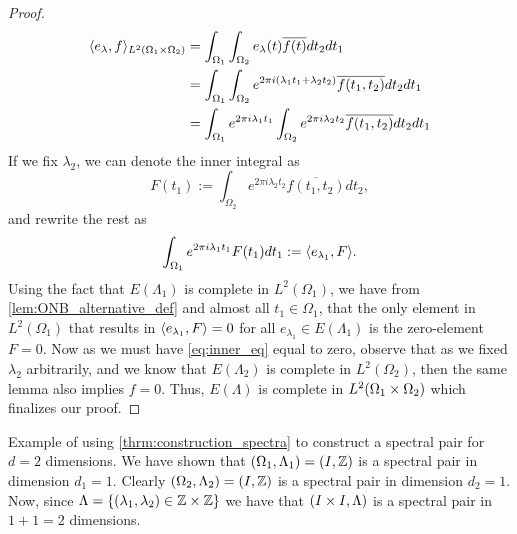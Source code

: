 \documentclass[../thesis.tex]{subfiles}
\begin{document}
\begin{proof}
    \begin{align*} %
        \braa{e_\lambda,f}_{L^2\brac{\Omega_1 \times \Omega_2}}
        &= \int_{\Omega_1} \int_{\Omega_2} e_\lambda(t) \overline{f(t)} dt_2dt_1 \\
        &= \int_{\Omega_1} \int_{\Omega_2} e^{2\pi i  (\lambda_1 t_1 + \lambda_2 t_2)} \overline{f(t_1,t_2)} dt_2 dt_1 \\
        &= \int_{\Omega_1} e^{2 \pi i \lambda_1 t_1} \int_{\Omega_2}e^{2 \pi i \lambda_2 t_2} \overline{f(t_1,t_2)} dt_2 dt_1 \\
    \end{align*}
    If we fix $\lambda_2$, we can denote the inner integral as 
    \begin{equation}\label{eq:inner_eq}
        F(t_1) := \int_{\Omega_2} e^{2 \pi i \lambda_2 t_2} \overline{f(t_1,t_2)} dt_2,
    \end{equation}
    and rewrite the rest as
    \begin{equation}\label{eq:outter_eq}
        \int_{\Omega_1} e^{2 \pi i \lambda_1 t_1} F(t_1) dt_1 := \langle e_{\lambda_1}, F\rangle.
    \end{equation}
    Using the fact that $E(\Lambda_1)$ is complete in $L^2(\Omega_1)$, we have from \cref{lem:ONB_alternative_def} and almost all $t_1 \in \Omega_1$, that the only element in $L^2(\Omega_1)$ that results in $\langle e_{\lambda_1}, F\rangle = 0$ for all $e_{\lambda_1} \in E(\Lambda_1)$ is the zero-element $F=0$. Now as we must have \cref{eq:inner_eq} equal to zero, observe that as we fixed $\lambda_2$ arbitrarily, and we know that $E(\Lambda_2)$ is complete in $L^2(\Omega_2)$, then the same lemma also implies $f=0$. Thus, $E(\Lambda)$ is complete in $L^2(\Omega_1 \times \Omega_2)$ which finalizes our proof.
\end{proof}


\begin{example}
    Example of using \cref{thrm:construction_spectra} to construct a spectral pair for $d=2$ dimensions. 
    We have shown that $(\Omega_1,\Lambda_1) = (I, \mathbb{Z})$ is a spectral pair in dimension $d_1=1$. Clearly $(\Omega_2,\Lambda_2) = (I, \mathbb{Z})$ is a spectral pair in dimension $d_2=1$. Now, since $\Lambda  = \{(\lambda_1,\lambda_2)\in \mathbb{Z} \times \mathbb{Z} \}$ we have that $(I \times I, \Lambda)$ is a spectral pair in $1+1=2$ dimensions.

    
\end{example}
\end{document}

